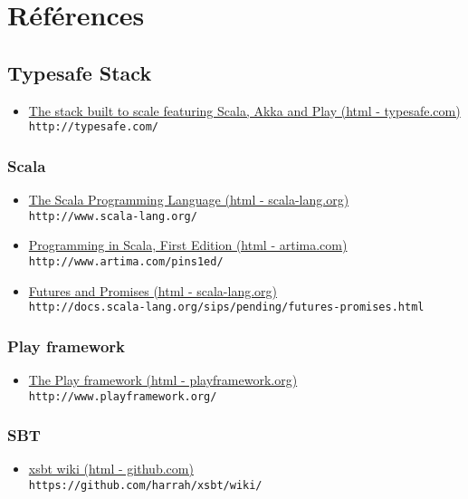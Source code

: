 \appendix

\chapter{Références}

\section{Typesafe Stack}
\begin{itemize}
\item \href{http://typesafe.com/}{The stack built to scale featuring Scala, Akka and Play (html - typesafe.com)}\\
\verb?http://typesafe.com/?
\end{itemize}

\subsection{Scala}
\begin{itemize}
\item \href{http://www.scala-lang.org/}{The Scala Programming Language (html - scala-lang.org)}\\
\verb?http://www.scala-lang.org/?

\item \href{http://www.artima.com/pins1ed/}{Programming in Scala, First Edition
(html - artima.com)}\\
\verb?http://www.artima.com/pins1ed/?

\item \href{http://docs.scala-lang.org/sips/pending/futures-promises.html}{Futures
and Promises (html - scala-lang.org)}\\
\verb?http://docs.scala-lang.org/sips/pending/futures-promises.html?
\end{itemize}

\subsection{Play framework}
\begin{itemize}
\item \href{http://www.playframework.org/}{The Play framework (html - playframework.org)}\\
\verb?http://www.playframework.org/?
\end{itemize}

\subsection{SBT}
\begin{itemize}
\item \href{https://github.com/harrah/xsbt/wiki/}{xsbt wiki (html - github.com)}\\
\verb?https://github.com/harrah/xsbt/wiki/?
\end{itemize}

